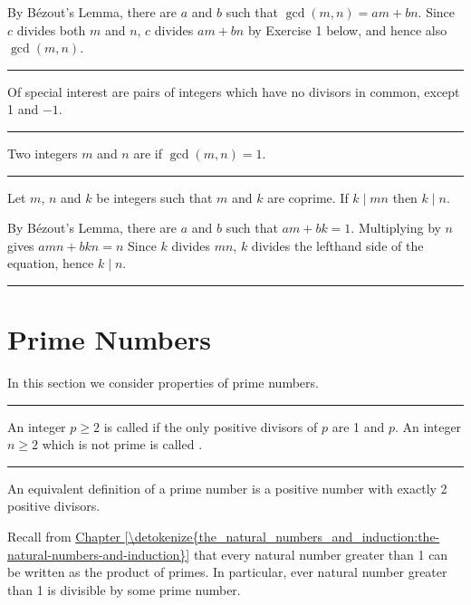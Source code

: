\documentclass[letterpaper,10pt,english]{sphinxmanual}
\begin{document}
\sphinxAtStartPar
{} By B‎ézout’s Lemma, there are \(a\) and \(b\) such that \(\gcd(m,n)=am+bn\). Since \(c\) divides both \(m\) and \(n\), \(c\) divides \(am+bn\) by Exercise 1 below, and hence also \(\gcd(m,n)\).


\bigskip\hrule\bigskip


\sphinxAtStartPar
Of special interest are pairs of integers which have no divisors in common, except 1 and \(-1\).


\bigskip\hrule\bigskip


\sphinxAtStartPar
{} Two integers \(m\) and \(n\) are  if \(\gcd(m,n) = 1\).


\bigskip\hrule\bigskip


\sphinxAtStartPar
{} Let \(m\), \(n\) and \(k\) be integers such that \(m\) and \(k\) are coprime. If \(k \mid mn\) then \(k \mid n\).

\sphinxAtStartPar
{} By B‎ézout’s Lemma, there are \(a\) and \(b\) such that \(am+bk = 1\). Multiplying by \(n\) gives \(amn + bkn = n\) Since \(k\) divides \(mn\), \(k\) divides the left\sphinxhyphen{}hand side of the equation, hence \(k \mid n\).


\bigskip\hrule\bigskip



\section{Prime Numbers}
\label{\detokenize{elementary_number_theory:prime-numbers}}
\sphinxAtStartPar
In this section we consider properties of prime numbers.


\bigskip\hrule\bigskip


\sphinxAtStartPar
{} An integer \(p\geq 2\) is called  if the only positive divisors of \(p\) are 1 and \(p\). An integer \(n \geq 2\) which is not prime is called .


\bigskip\hrule\bigskip


\sphinxAtStartPar
An equivalent definition of a prime number is a positive number with exactly 2 positive divisors.

\sphinxAtStartPar
Recall from \hyperref[\detokenize{the_natural_numbers_and_induction:the-natural-numbers-and-induction}]{Chapter \ref{\detokenize{the_natural_numbers_and_induction:the-natural-numbers-and-induction}}} that every natural number greater than 1 can be written as the product of primes. In particular, ever natural number greater than 1 is divisible by some prime number.
\end{document}
